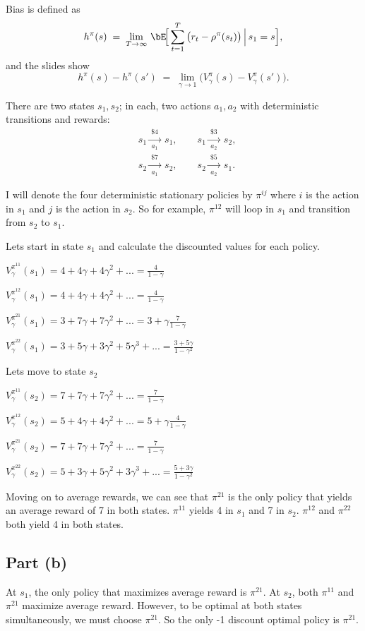 \documentclass[12pt]{article}
\begin{document}
Bias is defined as
\[
		h^\pi(s)\;=\;\lim_{T\to\infty}\,\bE\!\Big[\sum_{t=1}^T\big(r_t-\rho^\pi(s_t)\big)\,\Big|\,s_1=s\Big],
\]
and the slides show
\[
		h^\pi(s)-h^\pi(s')\;=\;\lim_{\gamma\to 1}\Big(V^\pi_\gamma(s)-V^\pi_\gamma(s')\Big).
\]

There are two states $s_1,s_2$; in each, two actions $a_1,a_2$ with deterministic transitions and rewards:
\[
		\begin{aligned}
				&s_1\xrightarrow[a_1]{\ \$4\ }\ s_1, \qquad s_1\xrightarrow[a_2]{\ \$3\ }\ s_2,\\
				&s_2\xrightarrow[a_1]{\ \$7\ }\ s_2, \qquad s_2\xrightarrow[a_2]{\ \$5\ }\ s_1.
		\end{aligned}
\]

I will denote the four deterministic stationary policies by $\pi^{ij}$ where $i$ is the action
in $s_1$ and $j$ is the action in $s_2$. So for example, $\pi^{12}$ will loop in $s_1$ and transition
from $s_2$ to $s_1$.

\medskip
Lets start in state $s_1$ and calculate the discounted values for each policy.

$V^{\pi^{11}}_\gamma(s_1) = 4 + 4\gamma + 4\gamma^2 + ... = \frac{4}{1-\gamma}$

$V^{\pi^{12}}_\gamma(s_1) = 4 + 4\gamma + 4\gamma^2 + ... = \frac{4}{1-\gamma}$

$V^{\pi^{21}}_\gamma(s_1) = 3 + 7\gamma + 7\gamma^2 + ... = 3+\gamma\frac{7}{1-\gamma}$

$V^{\pi^{22}}_\gamma(s_1) = 3 + 5\gamma + 3\gamma^2 + 5\gamma^3 + ... = \frac{3 + 5\gamma}{1-\gamma^2}$

\medskip
Lets move to state $s_2$

$V^{\pi^{11}}_\gamma(s_2) = 7 + 7\gamma + 7\gamma^2 + ... = \frac{7}{1-\gamma}$

$V^{\pi^{12}}_\gamma(s_2) = 5 + 4\gamma + 4\gamma^2 + ... = 5 +\gamma\frac{ 4}{1-\gamma}$

$V^{\pi^{21}}_\gamma(s_2) = 7 + 7\gamma + 7\gamma^2 + ... = \frac{7}{1-\gamma}$

$V^{\pi^{22}}_\gamma(s_2) = 5 + 3\gamma + 5\gamma^2 + 3\gamma^3 + ... = \frac{5 + 3\gamma}{1-\gamma^2}$

\medskip
Moving on to average rewards, we can see that $\pi^{21}$ is the only policy that yields an average reward of 7
in both states. $\pi^{11}$ yields 4 in $s_1$ and 7 in $s_2$. $\pi^{12}$ and $\pi^{22}$ both yield 4
in both states.

\newpage
\subsection*{Part (b)}
At $s_1$, the only policy that maximizes average reward is $\pi^{21}$. At $s_2$, both $\pi^{11}$ and $\pi^{21}$
maximize average reward. However, to be optimal at both states simultaneously, we must choose $\pi^{21}$.
So the only -1 discount optimal policy is $\pi^{21}$.
\end{document}
